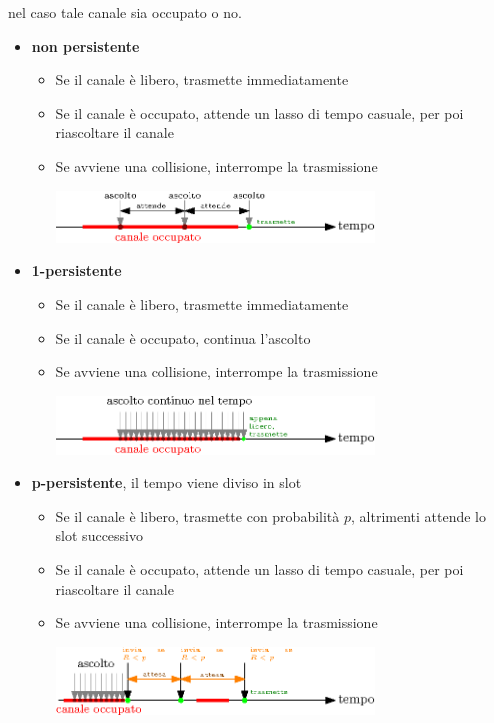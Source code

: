 \documentclass[12pt, letterpaper]{article}
\begin{document}
nel caso tale canale sia occupato o no.\begin{itemize}
    \item \textbf{non persistente}\begin{itemize}
        \item Se il canale è libero, trasmette immediatamente 
        \item Se il canale è occupato, attende un lasso di tempo casuale, per poi riascoltare il canale 
        \item Se avviene una collisione, interrompe la trasmissione\begin{center}
            \begin{center}
                \includegraphics[width=0.7\textwidth ]{images/nonpersistente.eps}
            \end{center} 
        \end{center} 
    \end{itemize}
    \item \textbf{1-persistente}\begin{itemize}
        \item Se il canale è libero, trasmette immediatamente 
        \item Se il canale è occupato, continua l'ascolto
        \item Se avviene una collisione, interrompe la trasmissione 
        \begin{center}
            \includegraphics[width=0.7\textwidth ]{images/1Persistente.eps}
        \end{center} 
    \end{itemize}
    \item \textbf{p-persistente}, il tempo viene diviso in slot\begin{itemize}
        \item Se il canale è libero, trasmette con probabilità $p$, altrimenti attende lo slot successivo 
        \item Se il canale è occupato, attende un lasso di tempo casuale, per poi riascoltare il canale 
        \item Se avviene una collisione, interrompe la trasmissione 
        \begin{center}
            \includegraphics[width=0.7\textwidth ]{images/pPersistente.eps}
        \end{center} 
    \end{itemize}
\end{itemize}
\end{document}
